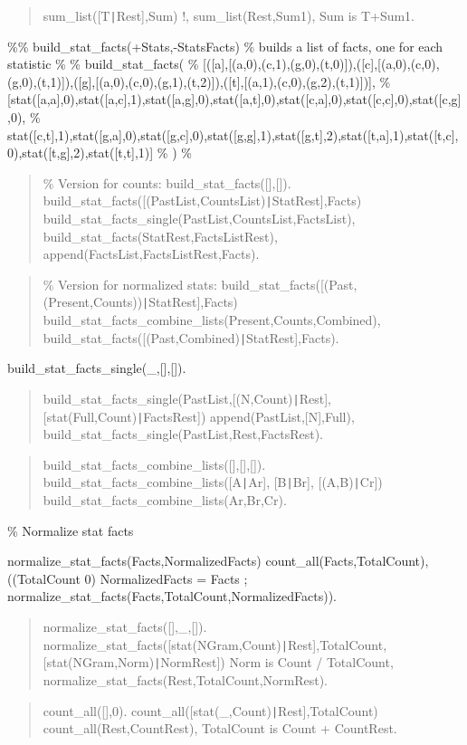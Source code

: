 \begin{quote}
sum_list([T{\tt\string|}Rest],Sum) \Sneck{}
!,
sum_list(Rest,Sum1),
Sum is T+Sum1.
\end{quote}

\%\% build_stat_facts(+Stats,-StatsFacts)
\% builds a list of facts, one for each statistic
\% \Sequal{}
\% build_stat_facts(
\% [([a],[(a,0),(c,1),(g,0),(t,0)]),([c],[(a,0),(c,0),(g,0),(t,1)]),([g],[(a,0),(c,0),(g,1),(t,2)]),([t],[(a,1),(c,0),(g,2),(t,1)])],
\% [stat([a,a],0),stat([a,c],1),stat([a,g],0),stat([a,t],0),stat([c,a],0),stat([c,c],0),stat([c,g],0),
\% stat([c,t],1),stat([g,a],0),stat([g,c],0),stat([g,g],1),stat([g,t],2),stat([t,a],1),stat([t,c],0),stat([t,g],2),stat([t,t],1)]
\% )
\% \Sequal{}

\begin{quote}
\% Version for counts:
build_stat_facts([],[]).
build_stat_facts([(PastList,CountsList){\tt\string|}StatRest],Facts) \Sneck{}
build_stat_facts_single(PastList,CountsList,FactsList),
build_stat_facts(StatRest,FactsListRest),
append(FactsList,FactsListRest,Facts).
\end{quote}

\begin{quote}
\% Version for normalized stats:
build_stat_facts([(Past,(Present,Counts)){\tt\string|}StatRest],Facts) \Sneck{}
build_stat_facts_combine_lists(Present,Counts,Combined),
build_stat_facts([(Past,Combined){\tt\string|}StatRest],Facts).
\end{quote}

build_stat_facts_single(_,[],[]).

\begin{quote}
build_stat_facts_single(PastList,[(N,Count){\tt\string|}Rest], [stat(Full,Count){\tt\string|}FactsRest]) \Sneck{}
append(PastList,[N],Full),
build_stat_facts_single(PastList,Rest,FactsRest).
\end{quote}

\begin{quote}
build_stat_facts_combine_lists([],[],[]).
build_stat_facts_combine_lists([A{\tt\string|}Ar], [B{\tt\string|}Br], [(A,B){\tt\string|}Cr]) \Sneck{}
build_stat_facts_combine_lists(Ar,Br,Cr).
\end{quote}

\% Normalize stat facts

\begin{center}
normalize_stat_facts(Facts,NormalizedFacts) \Sneck{}
count_all(Facts,TotalCount),
((TotalCount \Sequal{} 0) \Sifthen{}
NormalizedFacts = Facts
;
normalize_stat_facts(Facts,TotalCount,NormalizedFacts)).
\end{center}

\begin{quote}
normalize_stat_facts([],_,[]).
normalize_stat_facts([stat(NGram,Count){\tt\string|}Rest],TotalCount,[stat(NGram,Norm){\tt\string|}NormRest]) \Sneck{}
Norm is Count / TotalCount,
normalize_stat_facts(Rest,TotalCount,NormRest).
\end{quote}

\begin{quote}
count_all([],0).
count_all([stat(_,Count){\tt\string|}Rest],TotalCount) \Sneck{}
count_all(Rest,CountRest),
TotalCount is Count + CountRest.
\end{quote}

